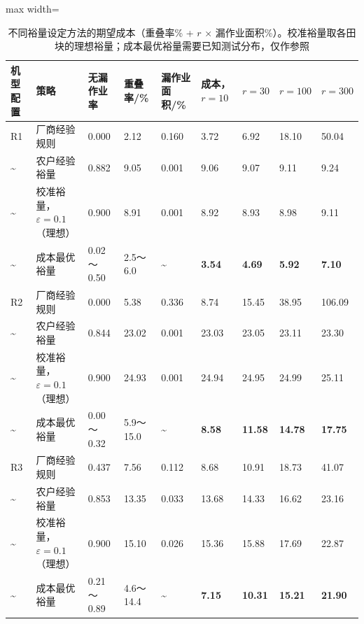 \documentclass[preprint,12pt,number,sort&compress]{elsarticle}
\begin{document}
\begin{table}[H]
\centering
\scriptsize
\caption{不同裕量设定方法的期望成本（重叠率\% + \(r\) × 漏作业面积\%）。校准裕量取各田块的理想裕量；成本最优裕量需要已知测试分布，仅作参照}\label{tab:7}
\begin{adjustbox}{max width=\textwidth}
\begin{tabular}{@{}lllllllll@{}}
\toprule
\textbf{机型配置} & \textbf{策略} & \textbf{无漏作业率} & \textbf{重叠率/\%} & \textbf{漏作业面积/\%} & \textbf{成本，\(r=10\)} & \textbf{\(r=30\)} & \textbf{\(r=100\)} & \textbf{\(r=300\)} \\
\midrule
R1 & 厂商经验规则 & 0.000 & 2.12 & 0.160 & 3.72 & 6.92 & 18.10 & 50.04 \\
\textasciitilde{} & 农户经验裕量 & 0.882 & 9.05 & 0.001 & 9.06 & 9.07 & 9.11 & 9.24 \\
\textasciitilde{} & 校准裕量，\(\varepsilon=0.1\)（理想） & 0.900 & 8.91 & 0.001 & 8.92 & 8.93 & 8.98 & 9.11 \\
\textasciitilde{} & 成本最优裕量 & 0.02～0.50 & 2.5～6.0 & \textasciitilde{} & \textbf{3.54} & \textbf{4.69} & \textbf{5.92} & \textbf{7.10} \\
R2 & 厂商经验规则 & 0.000 & 5.38 & 0.336 & 8.74 & 15.45 & 38.95 & 106.09 \\
\textasciitilde{} & 农户经验裕量 & 0.844 & 23.02 & 0.001 & 23.03 & 23.05 & 23.11 & 23.30 \\
\textasciitilde{} & 校准裕量，\(\varepsilon=0.1\)（理想） & 0.900 & 24.93 & 0.001 & 24.94 & 24.95 & 24.99 & 25.11 \\
\textasciitilde{} & 成本最优裕量 & 0.00～0.32 & 5.9～15.0 & \textasciitilde{} & \textbf{8.58} & \textbf{11.58} & \textbf{14.78} & \textbf{17.75} \\
R3 & 厂商经验规则 & 0.437 & 7.56 & 0.112 & 8.68 & 10.91 & 18.73 & 41.07 \\
\textasciitilde{} & 农户经验裕量 & 0.853 & 13.35 & 0.033 & 13.68 & 14.33 & 16.62 & 23.16 \\
\textasciitilde{} & 校准裕量，\(\varepsilon=0.1\)（理想） & 0.900 & 15.10 & 0.026 & 15.36 & 15.88 & 17.69 & 22.87 \\
\textasciitilde{} & 成本最优裕量 & 0.21～0.89 & 4.6～14.4 & \textasciitilde{} & \textbf{7.15} & \textbf{10.31} & \textbf{15.21} & \textbf{21.90} \\
\bottomrule
\end{tabular}
\end{adjustbox}
\end{table}
\end{document}

